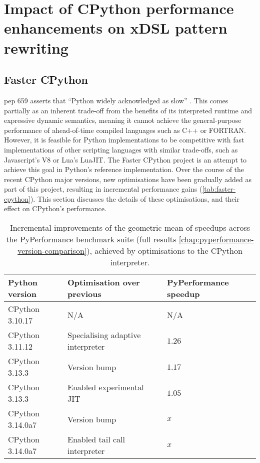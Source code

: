 \chapter{Impact of CPython performance enhancements on xDSL pattern rewriting}
\label{chap:impact-cpython-pattern-rewriting}



\section{Faster CPython}
\label{sec:faster-cpython}

\acf{pep} 659 asserts that ``Python widely acknowledged as slow'' \cite{pep659}.
This comes partially as an inherent trade-off from the benefits of its interpreted runtime and expressive dynamic semantics, meaning it cannot achieve the general-purpose performance of ahead-of-time compiled languages such as C++ or FORTRAN. However, it is feasible for Python implementations to be competitive with fast implementations of other scripting languages with similar trade-offs, such as Javascript's V8 or Lua's LuaJIT. The Faster CPython project is an attempt to achieve this goal in Python's reference implementation. Over the course of the recent CPython major versions, new optimisations have been gradually added as part of this project, resulting in incremental performance gains (\autoref{tab:faster-cpython}).
This section discusses the details of these optimisations, and their effect on CPython's performance. %


\begin{table}[H]
  \caption{Incremental improvements of the geometric mean of speedups across the PyPerformance benchmark suite (full results \autoref{chap:pyperformance-version-comparison}), achieved by optimisations to the CPython interpreter.}
  \label{tab:faster-cpython}
  \centering
  \begin{tabular}{lll}
    \toprule
    \textbf{Python version} & \textbf{Optimisation over previous} & \textbf{PyPerformance speedup} \\
    \midrule
    CPython 3.10.17 & N/A & N/A \\
    CPython 3.11.12 & Specialising adaptive interpreter & $1.26$ \\
    CPython 3.13.3 & Version bump & $1.17$ \\
    CPython 3.13.3 & Enabled experimental JIT & $1.05$ \\
    CPython 3.14.0a7 & Version bump & $x$ \\
    CPython 3.14.0a7 & Enabled tail call interpreter & $x$ \\
    \bottomrule
  \end{tabular}
\end{table}

